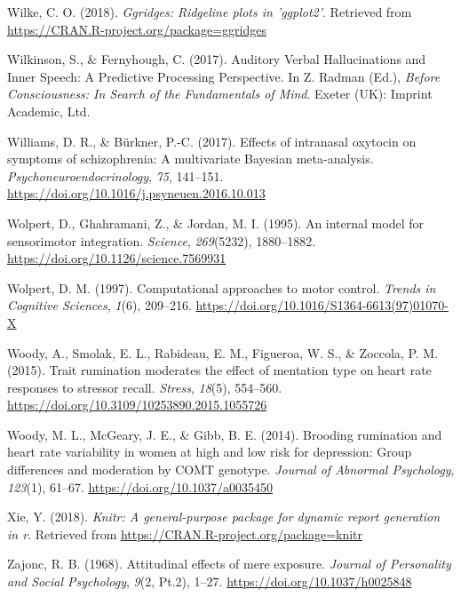 \documentclass[a4paper,12pt,twoside,openright,oldfontcommands]{memoir}
\begin{document}
\leavevmode\hypertarget{ref-R-ggridges}{}%
Wilke, C. O. (2018). \emph{Ggridges: Ridgeline plots in 'ggplot2'}. Retrieved from \url{https://CRAN.R-project.org/package=ggridges}

\leavevmode\hypertarget{ref-wilkinson_auditory_2017}{}%
Wilkinson, S., \& Fernyhough, C. (2017). Auditory Verbal Hallucinations and Inner Speech: A Predictive Processing Perspective. In Z. Radman (Ed.), \emph{Before Consciousness: In Search of the Fundamentals of Mind}. Exeter (UK): Imprint Academic, Ltd.

\leavevmode\hypertarget{ref-williams_effects_2017}{}%
Williams, D. R., \& Bürkner, P.-C. (2017). Effects of intranasal oxytocin on symptoms of schizophrenia: A multivariate Bayesian meta-analysis. \emph{Psychoneuroendocrinology}, \emph{75}, 141--151. \url{https://doi.org/10.1016/j.psyneuen.2016.10.013}

\leavevmode\hypertarget{ref-wolpert_internal_1995}{}%
Wolpert, D., Ghahramani, Z., \& Jordan, M. I. (1995). An internal model for sensorimotor integration. \emph{Science}, \emph{269}(5232), 1880--1882. \url{https://doi.org/10.1126/science.7569931}

\leavevmode\hypertarget{ref-wolpert_computational_1997}{}%
Wolpert, D. M. (1997). Computational approaches to motor control. \emph{Trends in Cognitive Sciences}, \emph{1}(6), 209--216. \url{https://doi.org/10.1016/S1364-6613(97)01070-X}

\leavevmode\hypertarget{ref-woody_trait_2015}{}%
Woody, A., Smolak, E. L., Rabideau, E. M., Figueroa, W. S., \& Zoccola, P. M. (2015). Trait rumination moderates the effect of mentation type on heart rate responses to stressor recall. \emph{Stress}, \emph{18}(5), 554--560. \url{https://doi.org/10.3109/10253890.2015.1055726}

\leavevmode\hypertarget{ref-woody_brooding_2014}{}%
Woody, M. L., McGeary, J. E., \& Gibb, B. E. (2014). Brooding rumination and heart rate variability in women at high and low risk for depression: Group differences and moderation by COMT genotype. \emph{Journal of Abnormal Psychology}, \emph{123}(1), 61--67. \url{https://doi.org/10.1037/a0035450}

\leavevmode\hypertarget{ref-R-knitr}{}%
Xie, Y. (2018). \emph{Knitr: A general-purpose package for dynamic report generation in r}. Retrieved from \url{https://CRAN.R-project.org/package=knitr}

\leavevmode\hypertarget{ref-zajonc_attitudinal_1968}{}%
Zajonc, R. B. (1968). Attitudinal effects of mere exposure. \emph{Journal of Personality and Social Psychology}, \emph{9}(2, Pt.2), 1--27. \url{https://doi.org/10.1037/h0025848}
\end{document}
